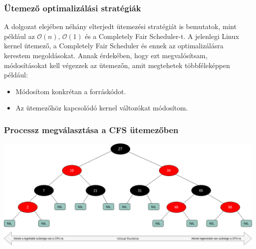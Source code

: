 \documentclass{beamer}
\begin{document}
\begin{frame}
\frametitle{Ütemező optimalizálási stratégiák}
A dolgozat elejében néhány elterjedt ütemezési stratégiát is bemutatok, mint például az $\mathcal{O}(n)$, $\mathcal{O}(1)$ és a Completely Fair Scheduler-t.
A jelenlegi Linux kernel ütemező, a Completely Fair Scheduler és ennek az optimalizálásra kerestem megoldásokat.
Annak érdekében, hogy ezt megvalósítsam, módosításokat kell végezzek az ütemezőn, amit megtehetek többféleképpen például:
\begin{itemize}

\item Módosítom konkrétan a forráskódot.

\item Az ütemezőhöz kapcsolódó kernel változókat módosítom.
\end{itemize}
\end{frame}

\begin{frame}
\frametitle{Processz megválasztása a CFS ütemezőben}
\begin{center}
\includegraphics[scale=0.25]{./images/redBlackTree.png}
\end{center}
\end{frame}
\end{document}
